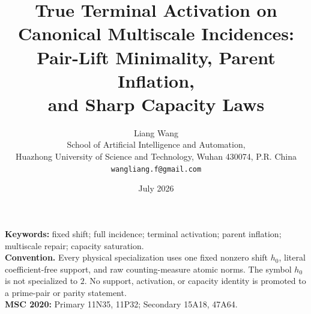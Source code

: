\documentclass[11pt]{article}
\title{True Terminal Activation on Canonical Multiscale Incidences:\\
Pair-Lift Minimality, Parent Inflation,\\
and Sharp Capacity Laws}
\author{Liang Wang\\
School of Artificial Intelligence and Automation,\\
Huazhong University of Science and Technology, Wuhan 430074, P.R. China\\
\texttt{wangliang.f@gmail.com}}
\date{July 2026}
\theoremstyle{remark}
\begin{document}
\maketitle


\noindent\textbf{Keywords:} fixed shift; full incidence; terminal activation;
parent inflation; multiscale repair; capacity saturation.\\[0.5em]
\noindent\textbf{Convention.} Every physical specialization uses one fixed
nonzero shift \(h_0\), literal coefficient-free support, and raw
counting-measure atomic norms.  The symbol \(h_0\) is not specialized to
\(2\).  No support, activation, or capacity identity is promoted to a
prime-pair or parity statement.\\[0.5em]
\noindent\textbf{MSC 2020:} Primary 11N35, 11P32; Secondary 15A18, 47A64.












\begingroup
\small
\raggedright


\endgroup
\end{document}
